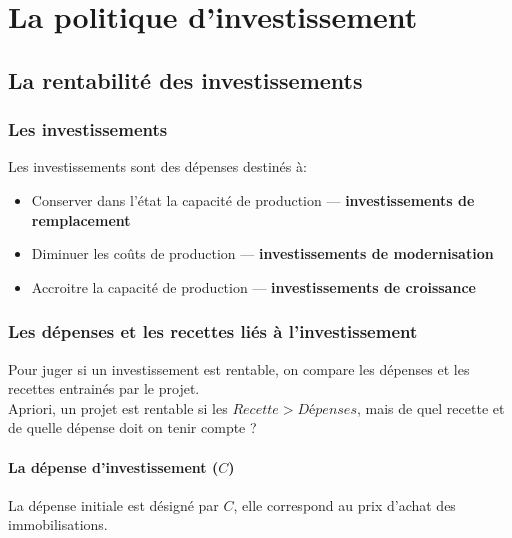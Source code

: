 \chapter{La politique d'investissement}
	\section{La rentabilité des investissements}
		\subsection{Les investissements}
		Les investissements sont des dépenses destinés à: 
		\begin{itemize}
			\item Conserver dans l'état la capacité de production --- \textbf{ investissements de remplacement} 
			\item Diminuer les coûts de production --- \textbf{investissements de modernisation}
			\item Accroitre la capacité de production --- \textbf{investissements de croissance}
		\end{itemize}
		\subsection{Les dépenses et les recettes liés à l'investissement}
		Pour juger si un investissement est rentable, on compare les dépenses et les recettes entrainés par le projet.\\
		Apriori, un projet est rentable si les $Recette > Dépenses$, mais de quel recette et de quelle dépense doit on tenir compte ?
		\subsubsection{La dépense d'investissement ($C$)}
		La dépense initiale est désigné par $C$, elle correspond au prix d'achat des immobilisations.
